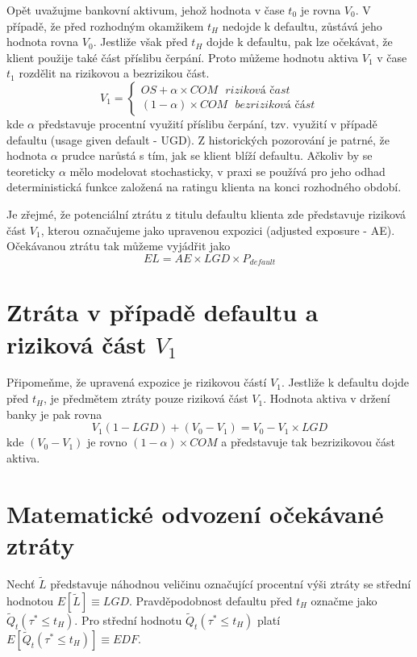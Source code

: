 Opět uvažujme bankovní aktivum, jehož hodnota v čase $t_0$ je rovna $V_0$. V případě, že před rozhodným okamžikem $t_H$ nedojde k defaultu, zůstává jeho hodnota rovna $V_0$. Jestliže však před $t_H$ dojde k defaultu, pak lze očekávat, že klient použije také část příslibu čerpání. Proto můžeme hodnotu aktiva $V_1$ v čase $t_1$ rozdělit na rizikovou a bezrizikou část.
\begin{equation}
V_1 =
\begin{cases}
OS + \alpha \times COM ~~~ \textit{riziková čast}\\
(1 - \alpha) \times COM ~~~ \textit{bezriziková část}
\end{cases}
\end{equation}
kde $\alpha$ představuje procentní využití příslibu čerpání, tzv. využití v případě defaultu (usage given default - UGD). Z historických pozorování je patrné, že hodnota $\alpha$ prudce narůstá s tím, jak se klient blíží defaultu. Ačkoliv by se teoreticky $\alpha$ mělo modelovat stochasticky, v praxi se používá pro jeho odhad deterministická funkce založená na ratingu klienta na konci rozhodného období.

Je zřejmé, že potenciální ztrátu z titulu defaultu klienta zde představuje riziková část $V_1$, kterou označujeme jako upravenou expozici (adjusted exposure - AE). Očekávanou ztrátu tak můžeme vyjádřit jako
\begin{equation}
EL = AE \times LGD \times P_{default}
\end{equation}

\section{Ztráta v případě defaultu a riziková část $V_1$}

Připomeňme, že upravená expozice je rizikovou částí $V_1$. Jestliže k defaultu dojde před $t_H$, je předmětem ztráty pouze riziková část $V_1$. Hodnota aktiva v držení banky je pak rovna
\begin{equation}
V_1(1 - LGD) + (V_0 - V_1) = V_0 - V_1 \times LGD
\end{equation}
kde $(V_0 - V_1)$ je rovno $(1 - \alpha) \times COM$ a představuje tak bezrizikovou část aktiva.

\section{Matematické odvození očekávané ztráty}

Nechť $\tilde{L}$ představuje náhodnou veličinu označující procentní výši ztráty se střední hodnotou $E[\tilde{L}] \equiv LGD$. Pravděpodobnost defaultu před $t_H$ označme jako $\tilde{Q}_t(\tau^* \le t_H)$. Pro střední hodnotu $\tilde{Q}_t(\tau^* \le t_H)$ platí $E[\tilde{Q}_t(\tau^* \le t_H)] \equiv EDF$.

